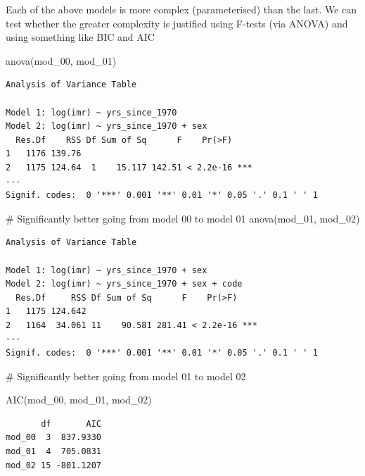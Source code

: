 \documentclass[
  letterpaper,
  DIV=11,
  numbers=noendperiod]{scrartcl}
\newenvironment{Shaded}{\begin{snugshade}}{\end{snugshade}}
\newcommand{\CommentTok}[1]{\textcolor[rgb]{0.37,0.37,0.37}{#1}}
\newcommand{\FunctionTok}[1]{\textcolor[rgb]{0.28,0.35,0.67}{#1}}
\newcommand{\NormalTok}[1]{\textcolor[rgb]{0.00,0.23,0.31}{#1}}
\begin{document}
Each of the above models is more complex (parameterised) than the last.
We can test whether the greater complexity is justified using F-tests
(via ANOVA) and using something like BIC and AIC

\begin{Shaded}
\begin{Highlighting}[]
\FunctionTok{anova}\NormalTok{(mod\_00, mod\_01)}
\end{Highlighting}
\end{Shaded}

\begin{verbatim}
Analysis of Variance Table

Model 1: log(imr) ~ yrs_since_1970
Model 2: log(imr) ~ yrs_since_1970 + sex
  Res.Df    RSS Df Sum of Sq      F    Pr(>F)    
1   1176 139.76                                  
2   1175 124.64  1    15.117 142.51 < 2.2e-16 ***
---
Signif. codes:  0 '***' 0.001 '**' 0.01 '*' 0.05 '.' 0.1 ' ' 1
\end{verbatim}

\begin{Shaded}
\begin{Highlighting}[]
\CommentTok{\# Significantly better going from model 00 to model 01}
\FunctionTok{anova}\NormalTok{(mod\_01, mod\_02)}
\end{Highlighting}
\end{Shaded}

\begin{verbatim}
Analysis of Variance Table

Model 1: log(imr) ~ yrs_since_1970 + sex
Model 2: log(imr) ~ yrs_since_1970 + sex + code
  Res.Df     RSS Df Sum of Sq      F    Pr(>F)    
1   1175 124.642                                  
2   1164  34.061 11    90.581 281.41 < 2.2e-16 ***
---
Signif. codes:  0 '***' 0.001 '**' 0.01 '*' 0.05 '.' 0.1 ' ' 1
\end{verbatim}

\begin{Shaded}
\begin{Highlighting}[]
\CommentTok{\# Significantly better going from model 01 to model 02}

\FunctionTok{AIC}\NormalTok{(mod\_00, mod\_01, mod\_02)}
\end{Highlighting}
\end{Shaded}

\begin{verbatim}
       df       AIC
mod_00  3  837.9330
mod_01  4  705.0831
mod_02 15 -801.1207
\end{verbatim}
\end{document}
